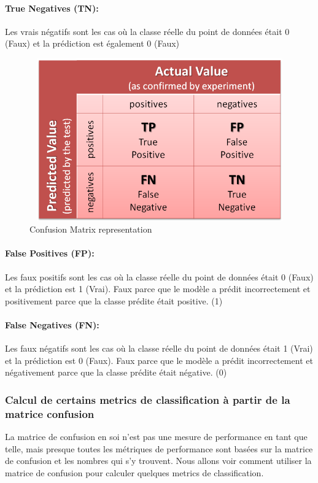 \documentclass[12pt, french]{article}
\begin{document}
\paragraph{True Negatives (TN):}
Les vrais négatifs sont les cas où la classe réelle du point de données était 0 (Faux) et la prédiction est également 0 (Faux)

\begin{figure}[h]
\includegraphics[width=14cm, height=7cm]{images/confusionmatrix.png}
\caption{Confusion Matrix representation}
\label{confusionmatrix}
\end{figure}

\paragraph{False Positives (FP):}
Les faux positifs sont les cas où la classe réelle du point de données était 0 (Faux) et la prédiction est 1 (Vrai). Faux parce que le modèle a prédit incorrectement et positivement parce que la classe prédite était positive. (1)
\paragraph{False Negatives (FN):}
Les faux négatifs sont les cas où la classe réelle du point de données était 1 (Vrai) et la prédiction est 0 (Faux). Faux parce que le modèle a prédit incorrectement et négativement parce que la classe prédite était négative. (0)



\subsubsection{Calcul de certains metrics de classification à partir de la matrice confusion}

La matrice de confusion en soi n'est pas une mesure de performance en tant que telle, mais presque toutes les métriques de performance sont basées sur la matrice de confusion et les nombres qui s'y trouvent. Nous allons voir comment utiliser la matrice de confusion pour calculer quelques metrics de classification.
\end{document}
